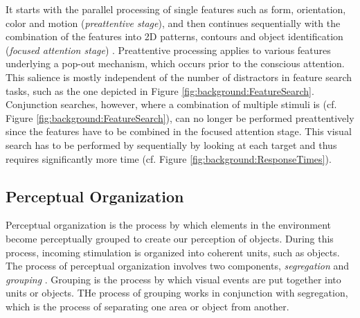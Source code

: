 It starts with the parallel processing of single features such as form, orientation, color and motion (\emph{preattentive stage}), and then continues sequentially with the combination of the features into 2D patterns, contours and object identification (\emph{focused attention stage}) \cite{Treisman:1985:PreattentiveProcessing}.
Preattentive processing applies to various features underlying a pop-out mechanism, which occurs prior to the conscious attention.
This salience is mostly independent of the number of distractors in feature search tasks, such as the one depicted in Figure \ref{fig:background:FeatureSearch}.
Conjunction searches, however, where a combination of multiple stimuli is  (cf. Figure \ref{fig:background:FeatureSearch}), can no longer be performed preattentively since the features have to be combined in the focused attention stage.
This visual search has to be performed by sequentially by looking at each target and thus requires significantly more time (cf. Figure \ref{fig:background:ResponseTimes}).



\subsection{Perceptual Organization}
Perceptual organization is the process by which elements in the environment become perceptually grouped to create our perception of objects.
During this process, incoming stimulation is organized into coherent units, such as objects.
The process of perceptual organization involves two components, \emph{segregation} and \emph{grouping} \cite{Peterson:2013:PerceptualOrganization}.
Grouping is the process by which visual events are put together into units or objects.
THe process of grouping works in conjunction with segregation, which is the process of separating one area or object from another. 

